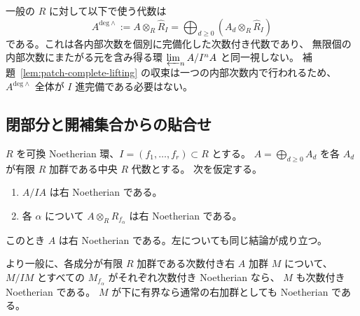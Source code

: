 \begin{remark}[全体の完備化との区別]
一般の $R$ に対して以下で使う代数は
\[
 A^{\mathrm{deg}\wedge}
 :=A\otimes_R\widehat R_I
 =\bigoplus_{d\geq0}(A_d\otimes_R\widehat R_I)
\]
である。これは各内部次数を個別に完備化した次数付き代数であり、
無限個の内部次数にまたがる元を含み得る環
$\varprojlim_n A/I^nA$ と同一視しない。
補題~\ref{lem:patch-complete-lifting} の収束は一つの内部次数内で行われるため、
$A^{\mathrm{deg}\wedge}$ 全体が $I$ 進完備である必要はない。
\end{remark}

\subsection{閉部分と開補集合からの貼合せ}

\begin{theorem}
\label{thm:patch-noetherian}
$R$ を可換 Noetherian 環、$I=(f_1,\ldots,f_r)\subset R$ とする。
$A=\bigoplus_{d\geq0}A_d$ を各 $A_d$ が有限 $R$ 加群である中央 $R$ 代数とする。
次を仮定する。
\begin{enumerate}
 \item $A/IA$ は右 Noetherian である。
 \item 各 $\alpha$ について $A\otimes_R R_{f_\alpha}$ は右 Noetherian である。
\end{enumerate}
このとき $A$ は右 Noetherian である。左についても同じ結論が成り立つ。

より一般に、各成分が有限 $R$ 加群である次数付き右 $A$ 加群 $M$ について、
$M/IM$ とすべての $M_{f_\alpha}$ がそれぞれ次数付き Noetherian なら、
$M$ も次数付き Noetherian である。
$M$ が下に有界なら通常の右加群としても Noetherian である。
\end{theorem}

